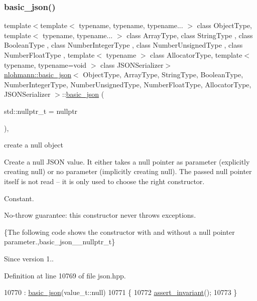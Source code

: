 \subsubsection{\texorpdfstring{basic\+\_\+json()}{basic\_json()}\hspace{0.1cm}{\footnotesize\ttfamily [2/9]}}
{\footnotesize\ttfamily template$<$template$<$ typename, typename, typename... $>$ class Object\+Type, template$<$ typename, typename... $>$ class Array\+Type, class String\+Type , class Boolean\+Type , class Number\+Integer\+Type , class Number\+Unsigned\+Type , class Number\+Float\+Type , template$<$ typename $>$ class Allocator\+Type, template$<$ typename, typename=void $>$ class J\+S\+O\+N\+Serializer$>$ \\
\hyperlink{classnlohmann_1_1basic__json}{nlohmann\+::basic\+\_\+json}$<$ Object\+Type, Array\+Type, String\+Type, Boolean\+Type, Number\+Integer\+Type, Number\+Unsigned\+Type, Number\+Float\+Type, Allocator\+Type, J\+S\+O\+N\+Serializer $>$\+::\hyperlink{classnlohmann_1_1basic__json}{basic\+\_\+json} (\begin{DoxyParamCaption}\item[{std\+::nullptr\+\_\+t}]{ = {\ttfamily nullptr} }\end{DoxyParamCaption})\hspace{0.3cm}{\ttfamily [inline]}, {\ttfamily [noexcept]}}



create a null object 

Create a {\ttfamily null} J\+S\+ON value. It either takes a null pointer as parameter (explicitly creating {\ttfamily null}) or no parameter (implicitly creating {\ttfamily null}). The passed null pointer itself is not read -- it is only used to choose the right constructor.

Constant.

No-\/throw guarantee\+: this constructor never throws exceptions.

\{The following code shows the constructor with and without a null pointer parameter.,basic\+\_\+json\+\_\+\+\_\+nullptr\+\_\+t\}

\begin{DoxySince}{Since}
version 1.. 
\end{DoxySince}


Definition at line 10769 of file json.\+hpp.


\begin{DoxyCode}
10770         : \hyperlink{classnlohmann_1_1basic__json_aed115142bd0c6c66c864700e0467df55}{basic\_json}(value\_t::null)
10771     \{
10772         \hyperlink{classnlohmann_1_1basic__json_a4a82d3fb7a111641decf35c2fb707c7f}{assert\_invariant}();
10773     \}
\end{DoxyCode}
\mbox{\label{classnlohmann_1_1basic__json_a5a6558bfd1be139a638f91f0e09fc737}} 
